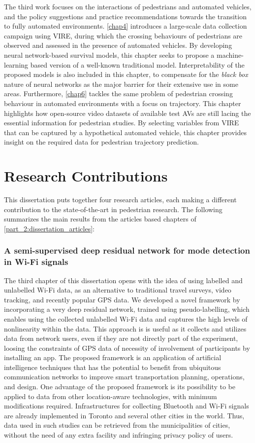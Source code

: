 The third work focuses on the interactions of pedestrians and automated vehicles, and the policy suggestions and practice recommendations towards the transition to fully automated environments. \cref{chap4} introduces a large-scale data collection campaign using VIRE, during which the crossing behaviours of pedestrians are observed and assessed in the presence of automated vehicles. By developing neural network-based survival models, this chapter seeks to propose a machine-learning based version of a well-known traditional model. Interpretability of the proposed models is also included in this chapter, to compensate for the \textit{black box} nature of neural networks as the major barrier for their extensive use in some areas.
Furthermore, \cref{chap6} tackles the same problem of pedestrian crossing behaviour in automated environments with a focus on trajectory. This chapter highlights how open-source video datasets of available test AVs are still lacing the essential information for pedestrian studies. By selecting variables from VIRE that can be captured by a hypothetical automated vehicle, this chapter provides insight on the required data for pedestrian trajectory prediction. 

\section{Research Contributions}
\label{chap7:sec1}
This dissertation puts together four research articles, each making a different contribution to the state-of-the-art in pedestrian research.
The following summarizes the main results from the articles based chapters of \cref{part_2:dissertation_articles}:

\subsubsection*{A semi-supervised deep residual network for mode detection in Wi-Fi signals}
The third chapter of this dissertation opens with the idea of using labelled and unlabelled Wi-Fi data, as an alternative to traditional travel surveys, video tracking, and recently popular GPS data.
We developed a novel framework by incorporating a very deep residual network, trained using pseudo-labelling, which enables using the collected unlabelled Wi-Fi data and captures the high levels of nonlinearity within the data.
This approach is is useful as it collects and utilizes data from network users, even if they are not directly part of the experiment, loosing the constraints of GPS data of necessity of involvement of participants by installing an app.
The proposed framework is an application of artificial intelligence techniques that has the potential to benefit from ubiquitous communication networks to improve smart transportation planning, operations, and design. One advantage of the proposed framework is its possibility to be applied to data from other location-aware technologies, with minimum modifications required. 
Infrastructures for collecting Bluetooth and Wi-Fi signals are already implemented in Toronto and several other cities in the world. Thus, data used in such studies can be retrieved from the municipalities of cities, without the need of any extra facility and infringing privacy policy of users. 


